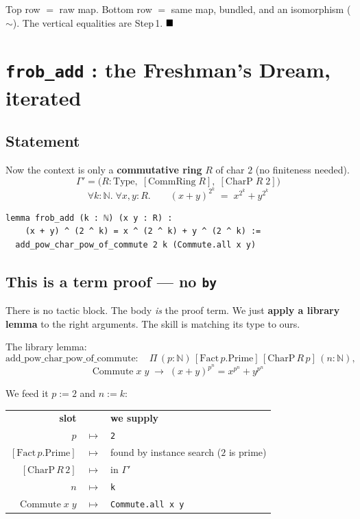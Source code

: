 \documentclass[11pt]{article}
\begin{document}
\medskip
\noindent
Top row $=$ raw map. Bottom row $=$ same map, bundled, and an isomorphism
($\sim$). The vertical equalities are Step\,1. $\hfill\blacksquare$

\bigskip\bigskip

\section{\texttt{frob\_add} : the Freshman's Dream, iterated}

\subsection*{Statement}

Now the context is only a \textbf{commutative ring} $R$ of char $2$
(no finiteness needed).
\[
\Gamma' = \bigl( R:\mathrm{Type},\;[\mathrm{CommRing}\;R],\;[\mathrm{CharP}\;R\;2] \bigr)
\]
\[
\forall k:\mathbb{N}.\;\forall x,y:R.\qquad
(x+y)^{2^{k}} \;=\; x^{2^{k}} + y^{2^{k}}
\]

\begin{lstlisting}
lemma frob_add (k : ℕ) (x y : R) :
    (x + y) ^ (2 ^ k) = x ^ (2 ^ k) + y ^ (2 ^ k) :=
  add_pow_char_pow_of_commute 2 k (Commute.all x y)
\end{lstlisting}

\bigskip
\subsection*{This is a term proof --- no \texttt{by}}

There is no tactic block. The body \emph{is} the proof term. We just
\textbf{apply a library lemma} to the right arguments. The skill is
matching its type to ours.

The library lemma:
\[
\mathrm{add\_pow\_char\_pow\_of\_commute} :
\quad
\Pi\,(p:\mathbb{N})\,[\mathrm{Fact}\,p.\mathrm{Prime}]\,[\mathrm{CharP}\,R\,p]
\,(n:\mathbb{N}),\;
\]
\[
\mathrm{Commute}\;x\;y \;\longrightarrow\;
(x+y)^{p^{n}} = x^{p^{n}} + y^{p^{n}}
\]

We feed it $p := 2$ and $n := k$:

\begin{center}
\begin{tabular}{r@{\;\;}c@{\;\;}l}
\textbf{slot} & & \textbf{we supply} \\[3pt]
$p$               & $\mapsto$ & \texttt{2} \\
$[\mathrm{Fact}\,p.\mathrm{Prime}]$ & $\mapsto$ & found by instance search ($2$ is prime) \\
$[\mathrm{CharP}\,R\,2]$            & $\mapsto$ & in $\Gamma'$ \\
$n$               & $\mapsto$ & \texttt{k} \\
$\mathrm{Commute}\;x\;y$ & $\mapsto$ & \texttt{Commute.all x y} \\
\end{tabular}
\end{center}
\end{document}
